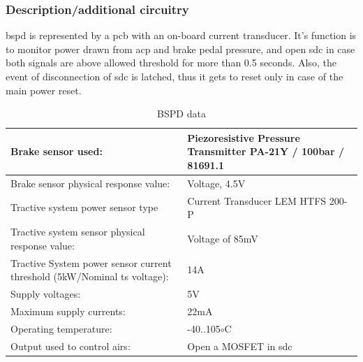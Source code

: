 
\subsubsection{Description/additional circuitry}

\Gls{bspd} is represented by a \gls{pcb} with an on-board current transducer. It’s function is to monitor
power drawn from \gls{acp} and brake pedal pressure, and open \gls{sdc} in case both signals are above
allowed threshold for more than 0.5 seconds. Also, the event of disconnection of \gls{sdc} is latched,
thus it gets to reset only in case of the main power reset.


\begin{table}[H]
	\centering
	\caption{BSPD data}
	\begin{tabularx}{\textwidth}{|X|X|}
		\hline
		Brake sensor used: & Piezoresistive Pressure Transmitter PA-21Y / 100bar / 81691.1 \\[\TableSize]
		\hline
		Brake sensor physical response value: & Voltage, 4.5V \\[\TableSize]
		\hline
		Tractive system power sensor type & Current Transducer LEM HTFS 200-P \\[\TableSize]
		\hline
		Tractive system sensor physical response value: & Voltage of 85mV \\[\TableSize]
		\hline
		Tractive System power sensor current threshold (5kW/Nominal \gls{ts} voltage): & 14A \\[\TableSize]
		\hline
		Supply voltages: & 5V \\[\TableSize]
		\hline
		Maximum supply currents: & 22mA \\[\TableSize]
		\hline
		Operating temperature: & -40..105$\circ$C\\[\TableSize]
		\hline
		Output used to control \glspl{air}: & Open a MOSFET in \gls{sdc} \\[\TableSize]
		\hline
	\end{tabularx}%
	\label{tab:bspd}%
\end{table}%

